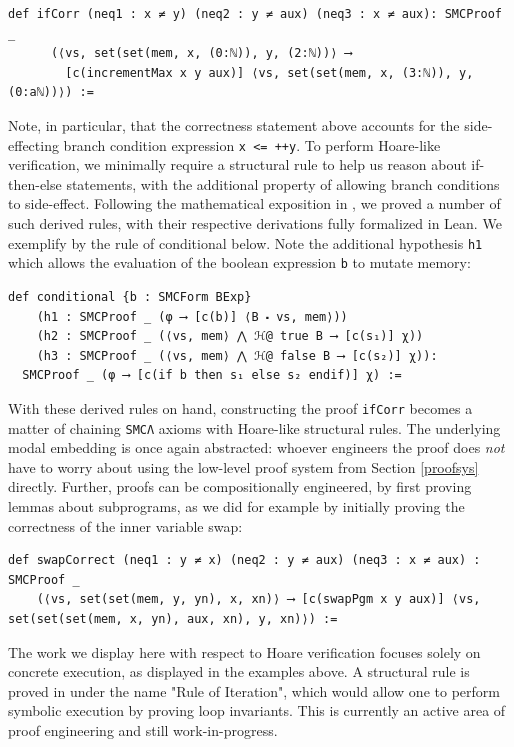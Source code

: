 \documentclass{easychair}
\theoremstyle{remark}
\begin{document}
\begin{lstlisting}
def ifCorr (neq1 : x ≠ y) (neq2 : y ≠ aux) (neq3 : x ≠ aux): SMCProof _
      (⟨vs, set(set(mem, x, (0:ℕ)), y, (2:ℕ))⟩ ⟶
        [c(incrementMax x y aux)] ⟨vs, set(set(mem, x, (3:ℕ)), y, (0:aℕ))⟩) :=
\end{lstlisting}

Note, in particular, that the correctness statement above accounts for the side-effecting branch condition expression \lstinline|x <= ++y|. To perform Hoare-like verification, we minimally require a structural rule to help us reason about if-then-else statements, with the additional property of allowing branch conditions to side-effect. Following the mathematical exposition in \cite{tableaux}, we proved a number of such derived rules, with their respective derivations fully formalized in Lean. We exemplify by the rule of conditional below. Note the additional hypothesis \lstinline{h1} which allows the evaluation of the boolean expression \lstinline{b} to mutate memory:

\begin{lstlisting}
def conditional {b : SMCForm BExp}
    (h1 : SMCProof _ (φ ⟶ [c(b)] ⟨B ⬝ vs, mem⟩))
    (h2 : SMCProof _ (⟨vs, mem⟩ ⋀ ℋ@ true B ⟶ [c(s₁)] χ))
    (h3 : SMCProof _ (⟨vs, mem⟩ ⋀ ℋ@ false B ⟶ [c(s₂)] χ)):
  SMCProof _ (φ ⟶ [c(if b then s₁ else s₂ endif)] χ) :=
\end{lstlisting}

With these derived rules on hand, constructing the proof \lstinline{ifCorr} becomes a matter of chaining \lstinline{SMCΛ} axioms with Hoare-like structural rules. The underlying modal embedding is once again abstracted: whoever engineers the proof does \textit{not} have to worry about using the low-level proof system from Section \ref{proofsys} directly. Further, proofs can be compositionally engineered, by first proving lemmas about subprograms, as we did for example by initially proving the correctness of the inner variable swap:

\begin{lstlisting}
def swapCorrect (neq1 : y ≠ x) (neq2 : y ≠ aux) (neq3 : x ≠ aux) : SMCProof _
    (⟨vs, set(set(mem, y, yn), x, xn)⟩ ⟶ [c(swapPgm x y aux)] ⟨vs, set(set(set(mem, x, yn), aux, xn), y, xn)⟩) :=
\end{lstlisting}

The work we display here with respect to Hoare verification focuses solely on concrete execution, as displayed in the examples above. A structural rule is proved in \cite{tableaux} under the name "Rule of Iteration", which would allow one to perform symbolic execution by proving loop invariants. This is currently an active area of proof engineering and still work-in-progress.
\end{document}
